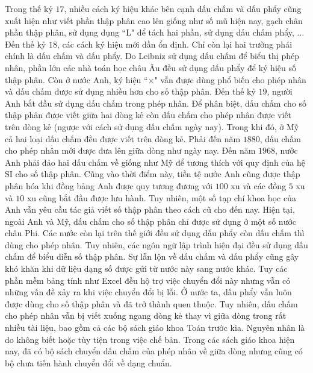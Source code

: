 \begin{multicols}{2}
\begin{figure}[H]
		\vspace*{-10pt}
	\end{figure}
	Trong thế kỷ $17$, nhiều cách ký hiệu khác bên cạnh dấu chấm và dấu phẩy cũng xuất hiện như viết phần thập phân cao lên giống như số mũ hiện nay, gạch chân phần thập phân, sử dụng dụng ``L" để tách hai phần, sử dụng dấu chấm phẩy, ... Đến thế kỷ $18$, các cách ký hiệu mới dần ổn định. Chỉ còn lại hai trường phái chính là dấu chấm và dấu phẩy. Do Leibniz sử dụng dấu chấm để biểu thị phép nhân, phần lớn các nhà toán học châu Âu đều sử dụng dấu phẩy để ký hiệu số thập phân. Còn ở nước Anh, ký hiệu ``$\times$" vẫn được dùng phổ biến cho phép nhân và dấu chấm được sử dụng nhiều hơn cho số thập phân.
	\vskip 0.1cm
	Đến thế kỷ $19$, người Anh bắt đầu sử dụng dấu chấm trong phép nhân. Để phân biệt, dấu chấm cho số thập phân được viết giữa hai dòng kẻ còn dấu chấm cho phép nhân được viết trên dòng kẻ (ngược với cách sử dụng dấu chấm ngày nay). Trong khi đó, ở Mỹ cả hai loại dấu chấm đều được viết trên dòng kẻ. Phải đến năm $1880$, dấu chấm cho phép nhân mới được đưa lên giữa dòng như ngày nay. Đến năm $1968$, nước Anh phải đảo hai dấu chấm về giống như Mỹ để tương thích với quy định của hệ SI cho số thập phân. Cũng vào thời điểm này, tiền tệ nước Anh cũng được thập phân hóa khi đồng bảng Anh được quy tương đương với $100$ xu và các đồng $5$ xu và $10$ xu cũng bắt đầu được lưu hành. Tuy nhiên, một số tạp chí khoa học của Anh vẫn yêu cầu tác giả viết số thập phân theo cách cũ cho đến nay. Hiện tại, ngoài Anh và Mỹ, dấu chấm cho số thập phân chỉ được sử dụng ở một số nước châu Phi. Các nước còn lại trên thế giới đều sử dụng dấu phẩy còn dấu chấm thì dùng cho phép nhân. Tuy nhiên, các ngôn ngữ lập trình hiện đại đều sử dụng dấu chấm để biểu diễn số thập phân. Sự lẫn lộn về dấu chấm và dấu phẩy cũng gây khó khăn khi dữ liệu dạng số được gửi từ nước này sang nước khác. Tuy các phần mềm bảng tính như Excel đều hộ trợ việc chuyển đổi này nhưng vẫn có những vấn đề xảy ra khi việc chuyển đổi bị lỗi.
	\vskip 0.1cm
	Ở nước ta, dấu phẩy vẫn luôn được dùng cho số thập phân và đã trở thành quen thuộc. Tuy nhiên, dấu chấm cho phép nhân vẫn bị viết xuống ngang dòng kẻ thay vì giữa dòng trong rất nhiều tài liệu, bao gồm cả các bộ sách giáo khoa Toán trước kia. Nguyên nhân là do không biết hoặc tùy tiện trong việc chế bản. Trong các sách giáo khoa hiện nay, đã có bộ sách chuyển dấu chấm của phép nhân về giữa dòng nhưng cũng có bộ chưa tiến hành chuyển đổi về dạng chuẩn.
	\vskip 0.1cm

\end{multicols}
